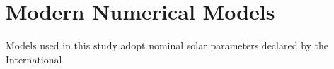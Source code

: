 \section{Modern Numerical Models}
Models used in this study adopt nominal solar parameters declared by the International 